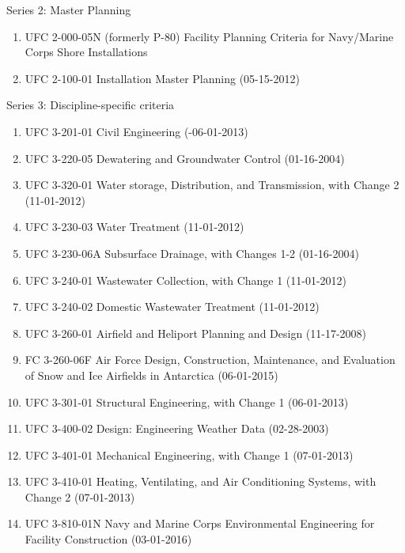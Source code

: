 \documentclass[10pt]{amsart}
\begin{document}
Series 2: Master Planning
\begin{enumerate}
\item UFC 2-000-05N (formerly P-80) Facility Planning Criteria for Navy/Marine Corps Shore Installations
\item UFC 2-100-01 Installation Master Planning (05-15-2012)
\end{enumerate}

Series 3: Discipline-specific criteria
\begin{enumerate}
\item UFC 3-201-01 Civil Engineering (-06-01-2013)
\item UFC 3-220-05 Dewatering and Groundwater Control (01-16-2004)
\item UFC 3-320-01 Water storage, Distribution, and Transmission, with Change 2 (11-01-2012)
\item UFC 3-230-03 Water Treatment (11-01-2012)
\item UFC 3-230-06A Subsurface Drainage, with Changes 1-2 (01-16-2004)
\item UFC 3-240-01 Wastewater Collection, with Change 1 (11-01-2012)
\item UFC 3-240-02 Domestic Wastewater Treatment (11-01-2012)
\item UFC 3-260-01 Airfield and Heliport Planning and Design (11-17-2008)
\item FC 3-260-06F Air Force Design, Construction, Maintenance, and Evaluation of Snow and Ice Airfields in Antarctica (06-01-2015)
\item UFC 3-301-01 Structural Engineering, with Change 1 (06-01-2013)
\item UFC 3-400-02 Design: Engineering Weather Data (02-28-2003)
\item UFC 3-401-01 Mechanical Engineering, with Change 1 (07-01-2013)
\item UFC 3-410-01 Heating, Ventilating, and Air Conditioning Systems, with Change 2 (07-01-2013)
\item UFC 3-810-01N Navy and Marine Corps Environmental Engineering for Facility Construction (03-01-2016)
\end{enumerate}
\end{document}
